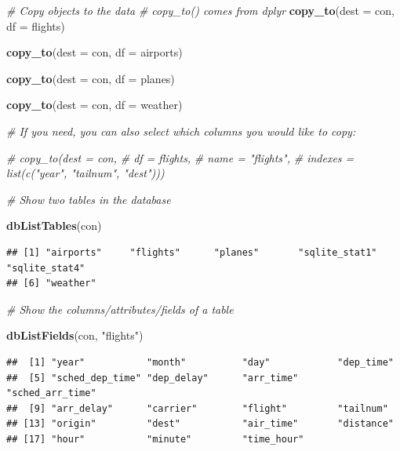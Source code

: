 \documentclass[
]{book}
\newenvironment{Shaded}{\begin{snugshade}}{\end{snugshade}}
\newcommand{\AttributeTok}[1]{\textcolor[rgb]{0.13,0.29,0.53}{#1}}
\newcommand{\CommentTok}[1]{\textcolor[rgb]{0.56,0.35,0.01}{\textit{#1}}}
\newcommand{\FunctionTok}[1]{\textcolor[rgb]{0.13,0.29,0.53}{\textbf{#1}}}
\newcommand{\NormalTok}[1]{#1}
\newcommand{\StringTok}[1]{\textcolor[rgb]{0.31,0.60,0.02}{#1}}
\begin{document}
\begin{Shaded}
\begin{Highlighting}[]
\CommentTok{\# Copy objects to the data }
\CommentTok{\# copy\_to() comes from dplyr}
\FunctionTok{copy\_to}\NormalTok{(}\AttributeTok{dest =}\NormalTok{ con, }
        \AttributeTok{df =}\NormalTok{ flights)}

\FunctionTok{copy\_to}\NormalTok{(}\AttributeTok{dest =}\NormalTok{ con, }
        \AttributeTok{df =}\NormalTok{ airports)}

\FunctionTok{copy\_to}\NormalTok{(}\AttributeTok{dest =}\NormalTok{ con,}
        \AttributeTok{df =}\NormalTok{ planes)}

\FunctionTok{copy\_to}\NormalTok{(}\AttributeTok{dest =}\NormalTok{ con, }
        \AttributeTok{df =}\NormalTok{ weather)}

\CommentTok{\# If you need, you can also select which columns you would like to copy:}

\CommentTok{\# copy\_to(dest = con, }
\CommentTok{\#          df = flights, }
\CommentTok{\#          name = "flights",}
\CommentTok{\#          indexes = list(c("year", "tailnum", "dest")))}
\end{Highlighting}
\end{Shaded}

\begin{Shaded}
\begin{Highlighting}[]
\CommentTok{\# Show two tables in the database }

\FunctionTok{dbListTables}\NormalTok{(con)}
\end{Highlighting}
\end{Shaded}

\begin{verbatim}
## [1] "airports"     "flights"      "planes"       "sqlite_stat1" "sqlite_stat4"
## [6] "weather"
\end{verbatim}

\begin{Shaded}
\begin{Highlighting}[]
\CommentTok{\# Show the columns/attributes/fields of a table }

\FunctionTok{dbListFields}\NormalTok{(con, }\StringTok{"flights"}\NormalTok{)}
\end{Highlighting}
\end{Shaded}

\begin{verbatim}
##  [1] "year"           "month"          "day"            "dep_time"      
##  [5] "sched_dep_time" "dep_delay"      "arr_time"       "sched_arr_time"
##  [9] "arr_delay"      "carrier"        "flight"         "tailnum"       
## [13] "origin"         "dest"           "air_time"       "distance"      
## [17] "hour"           "minute"         "time_hour"
\end{verbatim}
\end{document}
